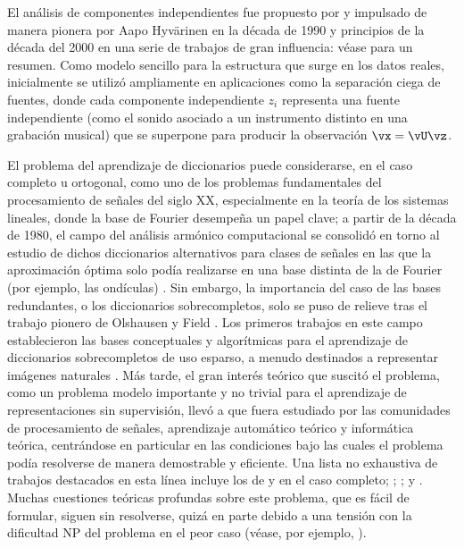 \documentclass[../../book-main.tex]{subfiles}
\begin{document}
El análisis de componentes independientes fue propuesto por \textcite{Ans-1985}
y impulsado de manera pionera por Aapo Hyv\"{a}rinen en la década de 1990 y principios 
de la década del 2000 en una serie de trabajos de gran influencia: véase \textcite{Hyvrinen-2000} para un resumen.
Como modelo sencillo para la estructura que surge en los datos reales, inicialmente se utilizó ampliamente en
aplicaciones como la separación ciega de fuentes, donde cada componente independiente
$z_i$ representa una fuente independiente (como el sonido asociado a un instrumento distinto
en una grabación musical) que se superpone para producir la observación $\vx = \vU \vz$.

El problema del aprendizaje de diccionarios puede considerarse, en el caso completo u ortogonal, como uno de
los problemas fundamentales del procesamiento de señales del siglo XX, especialmente
en la teoría de los sistemas lineales, donde la base de Fourier desempeña un papel clave;
a partir de la década de 1980, el campo del análisis armónico computacional se consolidó en torno
al estudio de dichos diccionarios alternativos para clases de señales en las que la aproximación óptima
solo podía realizarse en una base distinta de la de Fourier (por ejemplo, las ondículas)
\cite{Donoho1998-zf}. Sin embargo, la importancia del caso de las bases redundantes, o
los diccionarios sobrecompletos, solo se puso de relieve tras el trabajo pionero de
Olshausen y Field \cite{Olshausen1996-ap,Olshausen1997-yv}. Los primeros
trabajos en este campo establecieron las bases conceptuales y algorítmicas para el aprendizaje
de diccionarios sobrecompletos de uso esparso, a menudo destinados a representar
imágenes naturales
\cite{Donoho2001-tl,DonohoD2003-PNAS,Elad2006-yi,Murray2007-cw,aharon2006k,Mairal2014-nq,Gribonval2015-fy}.
Más tarde, el gran interés teórico que suscitó el problema, como
un problema modelo importante y no trivial para el aprendizaje de representaciones sin supervisión,
llevó a que fuera estudiado por las comunidades de procesamiento de señales, aprendizaje automático teórico y
informática teórica, centrándose en particular en las condiciones
bajo las cuales el problema podía resolverse de manera demostrable y eficiente.
Una lista no exhaustiva de trabajos destacados en esta línea incluye los de
\textcite{Spielman2012-tl} y \textcite{sun2017complete_a} en el caso completo;
\textcite{pmlr-v40-Arora15}; \textcite{Barak2015-uu}; y
\textcite{Qu2020Geometric}. Muchas cuestiones teóricas profundas sobre este
problema, que es fácil de formular, siguen sin resolverse, quizá en parte debido a una tensión con la
dificultad NP del problema en el peor caso (véase, por ejemplo, \textcite{Tillmann2015-up}).
\end{document}

